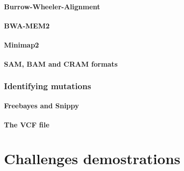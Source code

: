 \documentclass[
  letterpaper,
]{scrbook}
\begin{document}
\hypertarget{burrow-wheeler-alignment}{%
\subsection*{Burrow-Wheeler-Alignment}\label{burrow-wheeler-alignment}}

\hypertarget{bwa-mem2}{%
\subsection*{BWA-MEM2}\label{bwa-mem2}}

\hypertarget{minimap2}{%
\subsection*{Minimap2}\label{minimap2}}

\hypertarget{sam-bam-and-cram-formats}{%
\subsection*{SAM, BAM and CRAM formats}\label{sam-bam-and-cram-formats}}

\hypertarget{identifying-mutations}{%
\section*{Identifying mutations}\label{identifying-mutations}}

\hypertarget{freebayes-and-snippy}{%
\subsection*{Freebayes and Snippy}\label{freebayes-and-snippy}}

\hypertarget{the-vcf-file}{%
\subsection*{The VCF file}\label{the-vcf-file}}

\part{Challenges demostrations}
\end{document}
